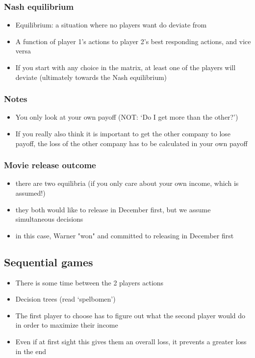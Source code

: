 \documentclass[12pt, a4paper, titlepage]{extarticle}
\begin{document}
    \subsubsection{Nash equilibrium}
    \begin{itemize}
        \item Equilibrium: a situation where no players want do deviate from
        \item A function of player 1's actions to player 2's best responding actions, and vice versa
        \item If you start with any choice in the matrix, at least one of the players will deviate (ultimately towards the Nash equilibrium)
    \end{itemize}
    
    \subsubsection{Notes}
    \begin{itemize}
        \item You only look at your own payoff (NOT: `Do I get more than the other?')
        \item If you really also think it is important to get the other company to lose payoff, the loss of the other company has to be calculated in your own payoff
    \end{itemize}
    
    \subsubsection{Movie release outcome} 
    \begin{itemize}
        \item there are two equilibria (if you only care about your own income, which is assumed!)
        \item they both would like to release in December first, but we assume simultaneous decisions
        \item in this case, Warner "won" and committed to releasing in December first
    \end{itemize}
    
    \subsection{Sequential games}
    \begin{itemize}
        \item There is some time between the 2 players actions
        \item Decision trees (read `spelbomen')
        \item The first player to choose has to figure out what the second player would do in order to maximize their income
        \item Even if at first sight this gives them an overall loss, it prevents a greater loss in the end
    \end{itemize}
\end{document}
